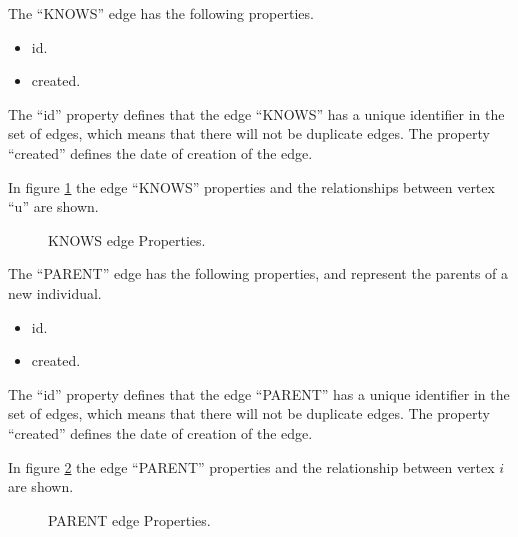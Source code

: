 The “KNOWS” edge has the following properties.
\begin{itemize}
\item id.
\item created.
\end{itemize}

The “id” property defines that the edge “KNOWS” has a unique identifier in the
set of edges, which means that there will not be duplicate edges. The property
“created” defines the date of creation of the edge.

In figure \ref{fig:Knows_edge} the edge “KNOWS” properties and the relationships between vertex “u”
are shown.

\begin{figure}
\captionsetup{justification=centering,margin=2cm}
\centering
\setlength\fboxsep{0pt}
\setlength\fboxrule{0.7pt}
\caption{KNOWS edge Properties.}
\label{fig:Knows_edge}
\end{figure}

The “PARENT” edge has the following properties, and represent the parents of a new individual.
\begin{itemize}
\item id.
\item created.
\end{itemize}

The “id” property defines that the edge “PARENT” has a unique identifier in the set of edges, which means that there will not be duplicate edges.
The property “created” defines the date of creation of the edge.

In figure \ref{fig:Parent_edge} the edge “PARENT” properties and the relationship between vertex $i$ are shown.

\begin{figure}
\captionsetup{justification=centering,margin=2cm}
\centering
\setlength\fboxsep{0pt}
\setlength\fboxrule{0.7pt}
\caption{PARENT edge Properties.}
\label{fig:Parent_edge}
\end{figure}

